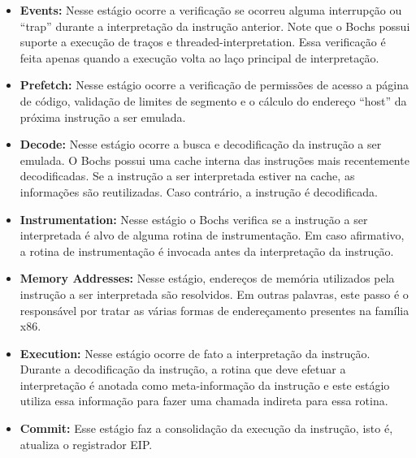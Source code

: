 \documentclass[11pt,twoside]{article}
\begin{document}
\begin{itemize}
	\item \textbf{Events:} Nesse estágio ocorre a verificação se ocorreu
          alguma interrupção ou ``trap'' durante a interpretação da instrução
          anterior. Note que o Bochs possui suporte a execução de traços e
          threaded-interpretation. Essa verificação é feita apenas quando a
          execução volta ao laço principal de interpretação.

	\item \textbf{Prefetch:} Nesse estágio ocorre a verificação de
          permissões de acesso a página de código, validação de limites de
          segmento e o cálculo do endereço ``host'' da próxima instrução a ser
          emulada.

	\item \textbf{Decode:} Nesse estágio ocorre a busca e decodificação da
          instrução a ser emulada. O Bochs possui uma cache interna das
          instruções mais recentemente decodificadas. Se a instrução a ser
          interpretada estiver na cache, as informações são reutilizadas. Caso
          contrário, a instrução é decodificada.

	\item \textbf{Instrumentation:} Nesse estágio o Bochs verifica se a
          instrução a ser interpretada é alvo de alguma rotina de
          instrumentação. Em caso afirmativo, a rotina de instrumentação é
          invocada antes da interpretação da instrução.

	\item \textbf{Memory Addresses:} Nesse estágio, endereços de memória
          utilizados pela instrução a ser interpretada são resolvidos.  Em
          outras palavras, este passo é o responsável por tratar as várias
          formas de endereçamento presentes na família x86.

	\item \textbf{Execution:} Nesse estágio ocorre de fato a interpretação
          da instrução. Durante a decodificação da instrução, a rotina que deve
          efetuar a interpretação é anotada como meta-informação da
          instrução e este estágio utiliza essa informação para fazer
          uma chamada indireta para essa rotina.

	\item \textbf{Commit:} Esse estágio faz a consolidação da execução da
          instrução, isto é, atualiza o registrador EIP.

\end{itemize}
\end{document}
